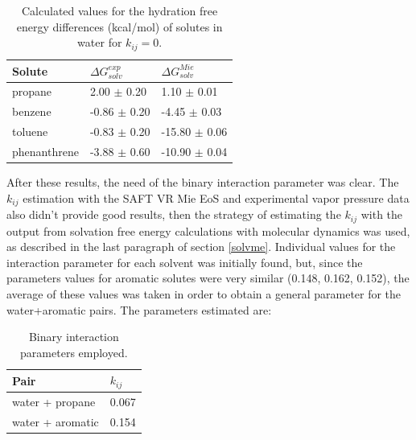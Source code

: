 \FloatBarrier
\begin{table}[h]
	\centering
	\caption{Calculated values for the hydration free energy differences (kcal/mol) of solutes in water for $k_{ij}=0$.}
	\label{tbl:solv3}
	\begin{tabular}{lll}
		\hline
		Solute  & $\Delta G_{solv}^{exp}$ & $\Delta G_{solv}^{Mie}$\\
		\hline
		propane   & 2.00 $\pm$ 0.20&1.10 $\pm$ 0.01   \\
		benzene  & -0.86 $\pm$ 0.20 & -4.45 $\pm$ 0.03   \\
		toluene  & -0.83 $\pm$ 0.20 &-15.80 $\pm$ 0.06   \\
		phenanthrene & -3.88 $\pm$ 0.60 &-10.90 $\pm$ 0.04   \\
		\hline
	\end{tabular}
\end{table}
\FloatBarrier

After these results, the need of  the binary interaction parameter was clear. The $k_{ij}$ estimation with the SAFT VR Mie EoS and experimental vapor pressure data also didn't provide good results, then the strategy of estimating the $k_{ij}$ with the output from solvation free energy calculations with molecular dynamics was used, as described in the last paragraph of section \ref{solvme}.  Individual values for the interaction parameter for each solvent was initially found, but, since the parameters values for aromatic solutes were very similar (0.148, 0.162, 0.152), the average of these values was taken in order to obtain a general parameter for the water+aromatic pairs. The parameters estimated are:

\begin{table}[h]
  \centering
  \caption{Binary interaction parameters employed.}
  \label{tbl:kij}
  \begin{tabular}{ll}
    \hline
      Pair & $k_{ij}$ \\
    \hline
    water  + propane      & 0.067  \\
    water  + aromatic      & 0.154 \\  
    \hline
  \end{tabular}
\end{table}

